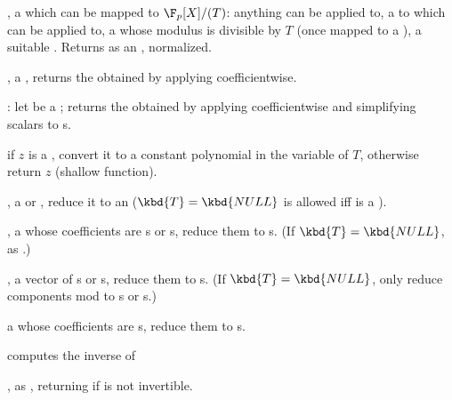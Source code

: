,  a  which can be
mapped to $\F_p[X]/(T)$: anything  can be applied to,
a  to which  can be applied to, a 
whose modulus is divisible by $T$ (once mapped to a ), a suitable
. Returns  as an , normalized.

,  a , returns the
 obtained by applying  coefficientwise.

: let  be a ;
returns the  obtained by applying 
coefficientwise and simplifying scalars to s.

if $z$ is a , convert it to a constant polynomial in the variable of
$T$, otherwise return $z$ (shallow function).

,  a  or ,
reduce it to an  ($\kbd{T} = \kbd{NULL}$ is allowed iff  is a
).

,  a 
whose coefficients are s or s, reduce them to s. (If
$\kbd{T} = \kbd{NULL}$, as .)

,  a vector of s or
s, reduce them to s. (If $\kbd{T} = \kbd{NULL}$, only
reduce components mod  to s or s.)

  a 
whose coefficients are s, reduce them to s.







 computes the inverse of 

, as , returning
 if  is not invertible.


